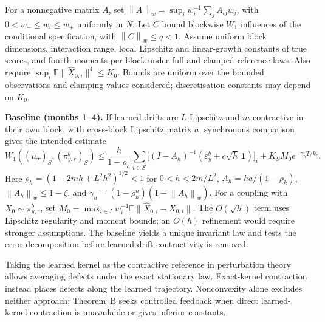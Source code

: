 \documentclass[12pt,a4paper]{article}
\newcommand{\E}{\mathbb E}
\newcommand{\W}{W_1}
\newcommand{\pir}{\pi_{y,r}^{b}}
\newcommand{\epsb}{\varepsilon^{b}_{y}}
\newcommand{\normw}[1]{\left\|#1\right\|_w}
\begin{document}
For a nonnegative matrix $A$, set $\normw{A}=\sup_i w_i^{-1}\sum_j A_{ij}w_j$, with $0<w_-\leq w_i\leq w_+$ uniformly in $N$. Let $C$ bound blockwise $\W$ influences of the conditional specification, with $\normw{C}\leq q<1$. Assume uniform block dimensions, interaction range, local Lipschitz and linear-growth constants of true scores, and fourth moments per block under full and clamped reference laws. Also require $\sup_i\E\|\widehat X_{0,i}\|^4\leq K_0$. Bounds are uniform over the bounded observations and clamping values considered; discretisation constants may depend on $K_0$.

\textbf{Baseline (months 1--4).} If learned drifts are $L$-Lipschitz and $\widetilde m$-contractive in their own block, with cross-block Lipschitz matrix $a$, synchronous comparison gives the intended estimate
\begin{equation}\label{eq:baseline}
 \W((\mu_T)_S,(\pir)_S)
 \leq\frac{h}{1-\rho_h}\sum_{i\in S}\bigl[(I-A_h)^{-1}
 (\epsb+c\sqrt h\,\mathbf1)\bigr]_i
 +K_SM_0e^{-\gamma_h T/k_r}.
\end{equation}
Here $\rho_h=(1-2\widetilde mh+L^2h^2)^{1/2}<1$ for $0<h<2\widetilde m/L^2$, $A_h=ha/(1-\rho_h)$, $\normw{A_h}\leq1-\zeta$, and $\gamma_h=(1-\rho_h^n)(1-\normw{A_h})$. For a coupling with $X_0\sim\pir$, set $M_0=\max_{i\in I}w_i^{-1}\E\|\widehat X_{0,i}-X_{0,i}\|$. The $O(\sqrt h)$ term uses Lipschitz regularity and moment bounds; an $O(h)$ refinement would require stronger assumptions. The baseline yields a unique invariant law and tests the error decomposition before learned-drift contractivity is removed.

Taking the learned kernel as the contractive reference in perturbation theory \cite{RS18} allows averaging defects under the exact stationary law. Exact-kernel contraction instead places defects along the learned trajectory. Nonconvexity alone excludes neither approach; Theorem~B seeks controlled feedback when direct learned-kernel contraction is unavailable or gives inferior constants.
\end{document}
